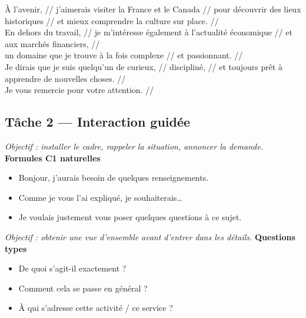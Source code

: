 \documentclass[12pt,a4paper]{article}
\begin{document}
\begin{tcolorbox}[title=\textbf{Présentation formelle ($\approx$ 1 min)}]
À l'avenir, // j'aimerais visiter la France et le Canada // pour découvrir des lieux historiques // et mieux comprendre la culture sur place. // \\

En dehors du travail, // je m'intéresse également à l'actualité économique // et aux marchés financiers, // \\
un domaine que je trouve à la fois complexe // et passionnant. // \\

Je dirais que je suis quelqu'un de curieux, // discipliné, // et toujours prêt à apprendre de nouvelles choses. // \\

Je vous remercie pour votre attention. //
\end{tcolorbox}

\subsection{Tâche 2 — Interaction guidée}

\begin{tcolorbox}[title=\textbf{STEP 1 · Entrée en interaction ($\approx$ 20–30 secondes)}]
\emph{Objectif : installer le cadre, rappeler la situation, annoncer la demande.}
\textbf{Formules C1 naturelles}
\begin{itemize}
  \item Bonjour, j'aurais besoin de quelques renseignements.
  \item Comme je vous l'ai expliqué, je souhaiterais…
  \item Je voulais justement vous poser quelques questions à ce sujet.
\end{itemize}
\end{tcolorbox}

\begin{tcolorbox}[title=\textbf{STEP 2 · Questions générales ($\approx$ 1 minute)}]
\emph{Objectif : obtenir une vue d'ensemble avant d'entrer dans les détails.}
\textbf{Questions types}
\begin{itemize}
  \item De quoi s'agit-il exactement ?
  \item Comment cela se passe en général ?
  \item À qui s'adresse cette activité / ce service ?
\end{itemize}
\end{tcolorbox}
\end{document}
